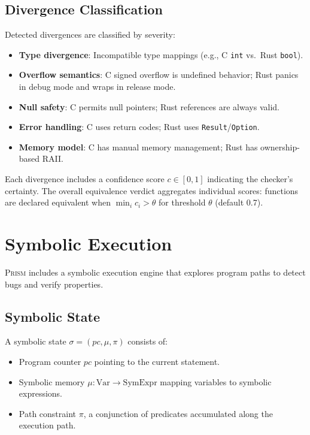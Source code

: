\documentclass[11pt,a4paper]{article}
\begin{document}
\subsection{Divergence Classification}

Detected divergences are classified by severity:
\begin{itemize}
  \item \textbf{Type divergence}: Incompatible type mappings
    (e.g., C \texttt{int} vs.\ Rust \texttt{bool}).
  \item \textbf{Overflow semantics}: C signed overflow is undefined
    behavior; Rust panics in debug mode and wraps in release mode.
  \item \textbf{Null safety}: C permits null pointers; Rust references
    are always valid.
  \item \textbf{Error handling}: C uses return codes; Rust uses
    \texttt{Result}/\texttt{Option}.
  \item \textbf{Memory model}: C has manual memory management; Rust
    has ownership-based RAII.
\end{itemize}

Each divergence includes a confidence score $c \in [0, 1]$ indicating
the checker's certainty. The overall equivalence verdict aggregates
individual scores: functions are declared equivalent when
$\min_i c_i > \theta$ for threshold $\theta$ (default 0.7).


\section{Symbolic Execution}\label{sec:symbolic}

\textsc{Prism} includes a symbolic execution engine that explores
program paths to detect bugs and verify properties.

\subsection{Symbolic State}

A symbolic state $\sigma = (pc, \mu, \pi)$ consists of:
\begin{itemize}
  \item Program counter $pc$ pointing to the current statement.
  \item Symbolic memory $\mu : \text{Var} \to \text{SymExpr}$ mapping
    variables to symbolic expressions.
  \item Path constraint $\pi$, a conjunction of predicates accumulated
    along the execution path.
\end{itemize}
\end{document}
